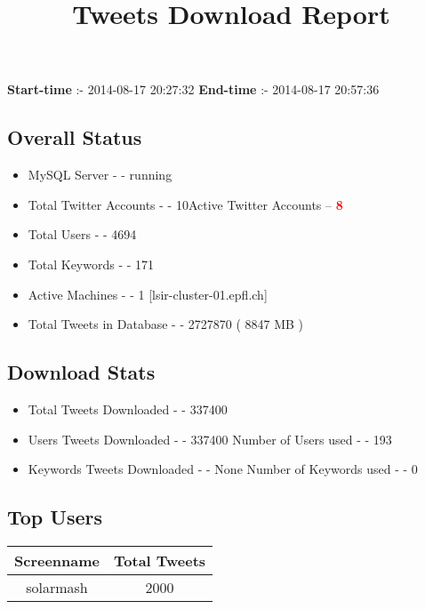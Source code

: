 \documentclass{article}\usepackage[T1]{fontenc}
\begin{document}
\title{\textbf{Tweets Download Report}}
               \date{}
                \maketitle
               \centerline{\textbf{Start-time} :- 2014-08-17 20:27:32 \hspace{40pt} \textbf{End-time} :- 2014-08-17 20:57:36}               \subsection*{Overall Status}                \begin{itemize}                \item MySQL Server - - running               \item Total Twitter Accounts - - 10\newline Active Twitter Accounts -- \textcolor{red}{\textbf{8}}               \item Total Users - - 4694               \item Total Keywords - - 171               \item Active Machines - - 1 [lsir-cluster-01.epfl.ch]               \item Total Tweets in Database - - 2727870 ( 8847 MB )               \end{itemize}               \subsection*{Download Stats}                \begin{itemize}                \item Total Tweets Downloaded - - 337400               \item Users Tweets Downloaded - - 337400 \newline Number of Users used - - 193               \item Keywords Tweets Downloaded - - None \newline Number of Keywords used - - 0              \end{itemize}              \subsection*{Top Users}\begin{tabular}{|c|c|}         \hline         Screenname & Total Tweets \\ 
 \hline
solarmash & 2000\\ 

\end{tabular}
\end{document}

